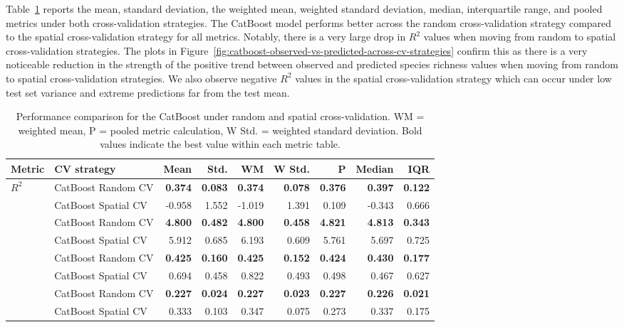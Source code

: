 Table~\ref{tab:catboost-cv-strategy-comparison} reports the mean, standard deviation, the weighted mean, weighted standard deviation, median, interquartile range, and pooled metrics under both cross-validation strategies. The CatBoost model performs better across the random cross-validation strategy compared to the spatial cross-validation strategy for all metrics. Notably, there is a very large drop in \(R^2\) values when moving from random to spatial cross-validation strategies. The plots in Figure~\ref{fig:catboost-observed-vs-predicted-across-cv-strategies} confirm this as there is a very noticeable reduction in the strength of the positive trend between observed and predicted species richness values when moving from random to spatial cross-validation strategies. We also observe negative \(R^2\) values in the spatial cross-validation strategy which can occur under low test set variance and extreme predictions far from the test mean.

\begin{table}[ht]
\centering
\small
\caption{Performance comparison for the CatBoost under random and spatial cross-validation. WM = weighted mean, P = pooled metric calculation, W Std. = weighted standard deviation. Bold values indicate the best value within each metric table.}
\label{tab:catboost-cv-strategy-comparison}
\begin{tabular}{llrrrrrrr}
\toprule
\textbf{Metric} & \textbf{CV strategy} & \textbf{Mean} & \textbf{Std.} & \textbf{WM} & \textbf{W Std.} & \textbf{P} & \textbf{Median} & \textbf{IQR} \\
\midrule
\multirow{2}{*}{\(R^2\)}
& CatBoost Random CV & \textbf{0.374} & \textbf{0.083} & \textbf{0.374} & \textbf{0.078} & \textbf{0.376} & \textbf{0.397} & \textbf{0.122} \\
& CatBoost Spatial CV & -0.958 & 1.552 & -1.019 & 1.391 & 0.109 & -0.343 & 0.666 \\

\addlinespace
\multirow{2}{*}{RMSE}
& CatBoost Random CV & \textbf{4.800} & \textbf{0.482} & \textbf{4.800} & \textbf{0.458} & \textbf{4.821} & \textbf{4.813} & \textbf{0.343} \\
& CatBoost Spatial CV & 5.912 & 0.685 & 6.193 & 0.609 & 5.761 & 5.697 & 0.725 \\

\addlinespace
\multirow{2}{*}{MAPE}
& CatBoost Random CV & \textbf{0.425} & \textbf{0.160} & \textbf{0.425} & \textbf{0.152} & \textbf{0.424} & \textbf{0.430} & \textbf{0.177} \\
& CatBoost Spatial CV & 0.694 & 0.458 & 0.822 & 0.493 & 0.498 & 0.467 & 0.627 \\

\addlinespace
\multirow{2}{*}{SMAPE}
& CatBoost Random CV & \textbf{0.227} & \textbf{0.024} & \textbf{0.227} & \textbf{0.023} & \textbf{0.227} & \textbf{0.226} & \textbf{0.021} \\
& CatBoost Spatial CV & 0.333 & 0.103 & 0.347 & 0.075 & 0.273 & 0.337 & 0.175 \\
\bottomrule
\end{tabular}
\end{table}

